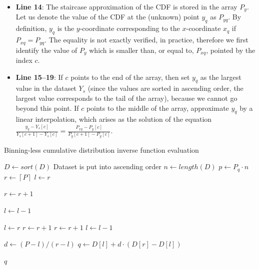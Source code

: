 \documentclass[10pt,final]{siamltex}
\begin{document}
\begin{itemize}
  \item \textbf{Line 14}: The staircase approximation of the CDF is stored in the array $P_y$. Let us denote the value of the CDF at the (unknown) point $y_q$ as $P_{yq}$. By definition, $y_q$ is the $y$-coordinate corresponding to the $x$-coordinate $x_q$ if $P_{xq} = P_{yq}$. The equality is not exactly verified, in practice, therefore we first identify the value of $P_y$ which is smaller than, or equal to, $P_{xq}$, pointed by the index $c$.
  \item \textbf{Line 15--19}: If $c$ points to the end of the array, then set $y_q$ as the largest value in the dataset $Y_s$ (since the values are sorted in ascending order, the largest value corresponds to the tail of the array), because we cannot go beyond this point. If $c$ points to the middle of the array, approximate $y_q$ by a linear interpolation, which arises as the solution of the equation $\tfrac{y_q-Y_s[c]}{Y_s[c+1]-Y_s[c]}=\tfrac{P_{xq}-P_y[c]}{P_y[c+1]-P_y[c]}$.
\end{itemize}
%



\begin{algorithm}
  \caption{Binning-less cumulative distribution inverse function evaluation}
  \label{invcdf_algo}
  \begin{algorithmic}[1]
    \State $D \gets sort(D)$
    \Comment Dataset is put into ascending order
    \State $n \gets length(D)$
    \State $p \gets P_q \cdot n$
    \State $r \gets  \left \lceil{P}\right \rceil$
    \EndIf
    \State $l \gets r$

    \State $ r \gets r + 1$
    \EndWhile

    \State $l \gets l - 1$
    \EndWhile

    \State $l \gets r$
    \State $r \gets r+1$
    \State $r \gets r + 1$
    \EndWhile
    \Else
    \State $ l \gets l - 1$
    \EndIf

    \State $d \gets (P-l)/(r-l) $
    \State $q \gets D[l] + d \cdot (D[r]-D[l])$

    \State \Return $q$
    \EndFunction
\end{algorithmic}
\end{algorithm}
\end{document}
